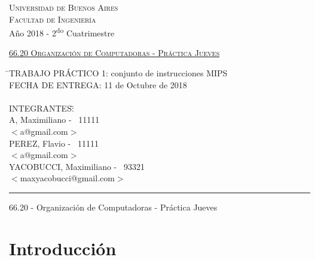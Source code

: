 \documentclass[a4paper,10pt]{article}
\numberwithin{equation}{section}
\numberwithin{figure}{section}
\begin{document}
\begin{titlepage}

\thispagestyle{empty}

\begin{center}

\large{\textsc{Universidad de Buenos Aires}}\\
\large{\textsc{Facultad de Ingeniería}}\\
\small{Año 2018 - 2\textsuperscript{do} Cuatrimestre}
\end{center}

\vfill

\begin{center}
\Large{\underline{\textsc{66.20 Organización de Computadoras - Práctica Jueves}}}
\end{center}

\vfill

\begin{tabbing}
\hspace{2cm}\=\+TRABAJO PRÁCTICO 1: conjunto de instrucciones MIPS\\
	FECHA DE ENTREGA: 11 de Octubre de 2018\\
\\
	INTEGRANTES:\hspace{-1cm}\=\+\hspace{1cm}\=\hspace{6cm}\=\\
		A, Maximiliano	\>\>- \ 11111\\
			\>\footnotesize{$<$a@gmail.com$>$}\\
		PEREZ, Flavio	\>\>- \ 11111\\
			\>\footnotesize{$<$a@gmail.com$>$}\\
		YACOBUCCI, Maximiliano	\>\>- \ 93321\\
			\>\footnotesize{$<$maxyacobucci@gmail.com$>$}\\
\end{tabbing}

\vfill

\hrule
\vspace{0.2cm}

\noindent\small{66.20 - Organización de Computadoras - Práctica Jueves}

\end{titlepage}

\newpage





\section{Introducción}
\end{document}
